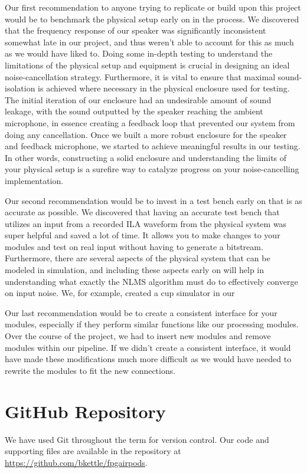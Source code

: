 \documentclass{fpgairpods}
\begin{document}
Our first recommendation to anyone trying to replicate or build upon this project would be to benchmark the physical setup early on in the process. We discovered that the frequency response of our speaker was significantly inconsistent somewhat late in our project, and thus weren't able to account for this as much as we would have liked to. Doing some in-depth testing to understand the limitations of the physical setup and equipment is crucial in designing an ideal noise-cancellation strategy. Furthermore, it is vital to ensure that maximal sound-isolation is achieved where necessary in the physical enclosure used for testing. The initial iteration of our enclosure had an undesirable amount of sound leakage, with the sound outputted by the speaker reaching the ambient microphone, in essence creating a feedback loop that prevented our system from doing any cancellation. Once we built a more robust enclosure for the speaker and feedback microphone, we started to achieve meaningful results in our testing. In other words, constructing a solid enclosure and understanding the limits of your physical setup is a surefire way to catalyze progress on your noise-cancelling implementation.


Our second recommendation would be to invest in a test bench early on that is as accurate as possible. We discovered that having an accurate test bench that utilizes an input from a recorded ILA waveform from the physical system was super helpful and saved a lot of time. It allows you to make changes to your modules and test on real input without having to generate a bitstream. Furthermore, there are several aspects of the physical system that can be modeled in simulation, and including these aspects early on will help in understanding what exactly the NLMS algorithm must do to effectively converge on input noise. We, for example, created a cup simulator in our 

Our last recommendation would be to create a consistent interface for your modules, especially if they perform similar functions like our processing modules. Over the course of the project, we had to insert new modules and remove modules within our pipeline. If we didn't create a consistent interface, it would have made these modifications much more difficult as we would have needed to rewrite the modules to fit the new connections. 

\appendix
\section{GitHub Repository}
We have used Git throughout the term for version control. Our code and supporting files are available in the repository at \url{https://github.com/bkettle/fpgairpods}.

\printbibliography
\end{document}
